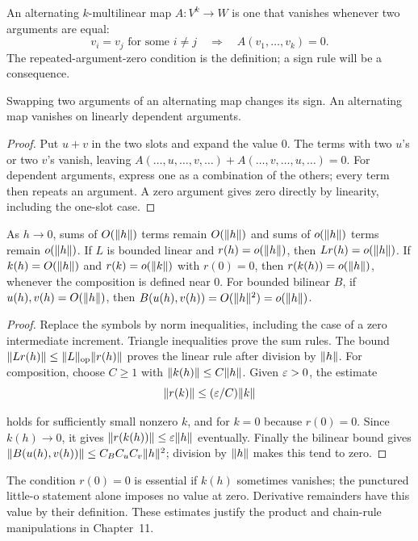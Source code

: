 \begin{definition}
An alternating $k$-multilinear map $A:V^k\to W$ is one that vanishes
whenever two arguments are equal:
\[
v_i=v_j\text{ for some }i\ne j\quad\Longrightarrow\quad A(v_1,\ldots,v_k)=0.
\]
The repeated-argument-zero condition is
the definition; a sign rule will be a consequence.
\end{definition}
\begin{proposition}[Alternation]
\label{prop:alternation}
Swapping two arguments of an alternating map changes its sign. An
alternating map vanishes on linearly dependent arguments.
\end{proposition}
\begin{proof}
Put $u+v$ in the two slots and expand the value $0$. The terms with two
$u$'s or two $v$'s vanish, leaving $A(\ldots,u,\ldots,v,\ldots)
+A(\ldots,v,\ldots,u,\ldots)=0$. For dependent arguments, express one
as a combination of the others; every term then repeats an argument.
A zero argument gives zero directly by linearity, including the one-slot case.
\end{proof}

\begin{proposition}
\label{prop:norm-remainder-rules}
As $h\to0$, sums of $O(\lVert h\rVert)$ terms remain $O(\lVert h\rVert)$ and sums of
$o(\lVert h\rVert)$ terms remain $o(\lVert h\rVert)$. If $L$ is bounded linear and
$r(h)=o(\lVert h\rVert)$, then $Lr(h)=o(\lVert h\rVert)$. If
$k(h)=O(\lVert h\rVert)$ and $r(k)=o(\lVert k\rVert)$ with $r(0)=0$, then
$r(k(h))=o(\lVert h\rVert)$, whenever the composition is defined near $0$.
For bounded bilinear $B$, if $u(h),v(h)=O(\lVert h\rVert)$, then
$B(u(h),v(h))=O(\lVert h\rVert^2)=o(\lVert h\rVert)$.
\end{proposition}
\begin{proof}
Replace the symbols by norm inequalities, including the case
of a zero intermediate increment. Triangle inequalities prove the sum
rules. The bound $\lVert Lr(h)\rVert\leq\lVert L\rVert_{\mathrm{op}}\lVert r(h)\rVert$
proves the linear rule after division by $\lVert h\rVert$.
For composition, choose $C\geq1$ with $\lVert k(h)\rVert\leq C\lVert h\rVert$.
Given $\varepsilon>0$, the estimate
\[
\lVert r(k)\rVert\leq(\varepsilon/C)\lVert k\rVert
\]

holds for sufficiently small nonzero $k$, and for $k=0$ because $r(0)=0$.
Since $k(h)\to0$, it gives $\lVert r(k(h))\rVert\leq\varepsilon\lVert h\rVert$ eventually.
Finally the bilinear bound gives
$\lVert B(u(h),v(h))\rVert\leq C_B C_u C_v\lVert h\rVert^2$; division by
$\lVert h\rVert$ makes this tend to zero.
\end{proof}
The condition $r(0)=0$ is essential if $k(h)$ sometimes vanishes; the
punctured little-o statement alone imposes no value at zero. Derivative
remainders have this value by their definition. These estimates justify
the product and chain-rule manipulations in Chapter~11.

